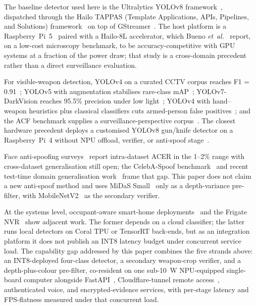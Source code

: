 \documentclass{ieeeaccess}
\begin{document}
The baseline detector used here is the Ultralytics YOLOv8 framework~\cite{b9}, dispatched through the Hailo TAPPAS (Template Applications, APIs, Pipelines, and Solutions) framework~\cite{b10} on top of GStreamer~\cite{b13}. The host platform is a Raspberry~Pi~5~\cite{b11} paired with a Hailo-8L accelerator, which Bueno \emph{et~al.}~\cite{b4} report, on a low-cost microscopy benchmark, to be accuracy-competitive with GPU systems at a fraction of the power draw; that study is a cross-domain precedent rather than a direct surveillance evaluation.

For visible-weapon detection, YOLOv4 on a curated CCTV corpus reaches F1 = 0.91~\cite{b18}; YOLOv5 with augmentation stabilises rare-class mAP~\cite{b30}; YOLOv7-DarkVision reaches 95.5\% precision under low light~\cite{b19}; YOLOv4 with hand--weapon heuristics plus classical classifiers cuts armed-person false positives~\cite{b20}; and the ACF benchmark supplies a surveillance-perspective corpus~\cite{b32}. The closest hardware precedent deploys a customised YOLOv8 gun/knife detector on a Raspberry~Pi~4 without NPU offload, verifier, or anti-spoof stage~\cite{b28}.

Face anti-spoofing surveys~\cite{b21} report intra-dataset ACER in the 1--2\% range with cross-dataset generalisation still open; the CelebA-Spoof benchmark~\cite{b22} and recent test-time domain generalisation work~\cite{b23} frame that gap. This paper does not claim a new anti-spoof method and uses MiDaS Small~\cite{b14} only as a depth-variance pre-filter, with MobileNetV2~\cite{b15} as the secondary verifier.

At the systems level, occupant-aware smart-home deployments~\cite{b31} and the Frigate NVR~\cite{b24} show adjacent work. The former depends on a cloud classifier; the latter runs local detectors on Coral TPU or TensorRT back-ends, but as an integration platform it does not publish an INT8 latency budget under concurrent service load. The capability gap addressed by this paper combines the five strands above: an INT8-deployed four-class detector, a secondary weapon-crop verifier, and a depth-plus-colour pre-filter, co-resident on one sub-10~W NPU-equipped single-board computer alongside FastAPI~\cite{b12}, Cloudflare-tunnel remote access~\cite{b17}, authenticated voice, and encrypted-evidence services, with per-stage latency and FPS-flatness measured under that concurrent load.
\end{document}
